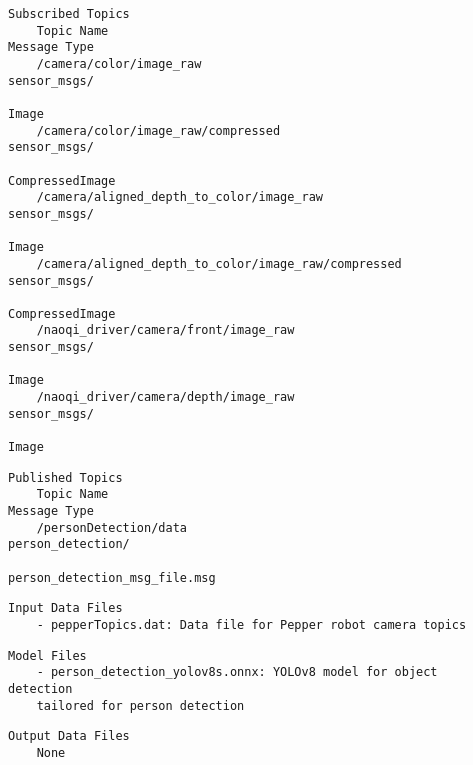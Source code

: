 \documentclass{CSSRforAfrica}
\newcommand{\checkboxChecked}{\fbox{\ding{51}}} %
\begin{document}
\begin{description}
\item[\checkboxChecked] 
 {\small 
\begin{verbatim}
Subscribed Topics
    Topic Name                                                  Message Type
    /camera/color/image_raw                                     sensor_msgs/
                                                                 Image
    /camera/color/image_raw/compressed                          sensor_msgs/
                                                                 CompressedImage              
    /camera/aligned_depth_to_color/image_raw                    sensor_msgs/
                                                                 Image
    /camera/aligned_depth_to_color/image_raw/compressed         sensor_msgs/
                                                                 CompressedImage
    /naoqi_driver/camera/front/image_raw                        sensor_msgs/
                                                                 Image
    /naoqi_driver/camera/depth/image_raw                        sensor_msgs/
                                                                 Image
\end{verbatim}}

\item[\checkboxChecked] 
 {\small 
\begin{verbatim}
Published Topics
    Topic Name                                                  Message Type
    /personDetection/data                                       person_detection/
                                                  person_detection_msg_file.msg
\end{verbatim}}

\item[\checkboxChecked] 
 {\small 
\begin{verbatim}
Input Data Files
    - pepperTopics.dat: Data file for Pepper robot camera topics
\end{verbatim}}

\item[\checkboxChecked] 
 {\small 
\begin{verbatim}
Model Files
    - person_detection_yolov8s.onnx: YOLOv8 model for object detection 
    tailored for person detection
\end{verbatim}}

\item[\checkboxChecked] 
 {\small 
\begin{verbatim}
Output Data Files
    None
\end{verbatim}}


\end{description}
\end{document}
